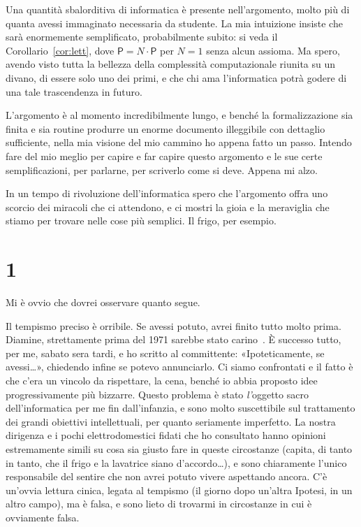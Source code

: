 \documentclass[11pt,a4paper]{amsart}
\begin{document}
Una quantità sbalorditiva di informatica è presente nell'argomento, molto più di
quanta avessi immaginato necessaria da studente. La mia intuizione insiste che
sarà enormemente semplificato, probabilmente subito: si veda il
Corollario~\ref{cor:lett}, dove $\mathsf{P} = N \cdot \mathsf{P}$ per $N = 1$
senza alcun assioma. Ma spero, avendo visto tutta la bellezza della complessità
computazionale riunita su un divano, di essere solo uno dei primi, e che chi ama
l'informatica potrà godere di una tale trascendenza in futuro.

L'argomento è al momento incredibilmente lungo, e benché la formalizzazione sia
finita e sia routine produrre un enorme documento illeggibile con dettaglio
sufficiente, nella mia visione del mio cammino ho appena fatto un passo.
Intendo fare del mio meglio per capire e far capire questo argomento e le sue
certe semplificazioni, per parlarne, per scriverlo come si deve. Appena mi alzo.

In un tempo di rivoluzione dell'informatica spero che l'argomento offra uno
scorcio dei miracoli che ci attendono, e ci mostri la gioia e la meraviglia che
stiamo per trovare nelle cose più semplici. Il frigo, per esempio.

\section*{1}

Mi è ovvio che dovrei osservare quanto segue.

Il tempismo preciso è orribile. Se avessi potuto, avrei finito tutto molto
prima. Diamine, strettamente prima del 1971 sarebbe stato
carino~\cite{cook}. È successo tutto, per me, sabato sera tardi, e ho scritto al
committente: «Ipoteticamente, se avessi\dots», chiedendo infine se potevo
annunciarlo. Ci siamo confrontati e il fatto è che c'era un vincolo da
rispettare, la cena, benché io abbia proposto idee progressivamente più
bizzarre. Questo problema è stato \emph{l'}oggetto sacro dell'informatica per
me fin dall'infanzia, e sono molto suscettibile sul trattamento dei grandi
obiettivi intellettuali, per quanto seriamente imperfetto. La nostra dirigenza e
i pochi elettrodomestici fidati che ho consultato hanno opinioni estremamente
simili su cosa sia giusto fare in queste circostanze (capita, di tanto in tanto,
che il frigo e la lavatrice siano d'accordo\dots), e sono chiaramente l'unico
responsabile del sentire che non avrei potuto vivere aspettando ancora. C'è
un'ovvia lettura cinica, legata al tempismo (il giorno dopo un'altra Ipotesi, in
un altro campo), ma è falsa, e sono lieto di trovarmi in circostanze in cui è
ovviamente falsa.
\end{document}
